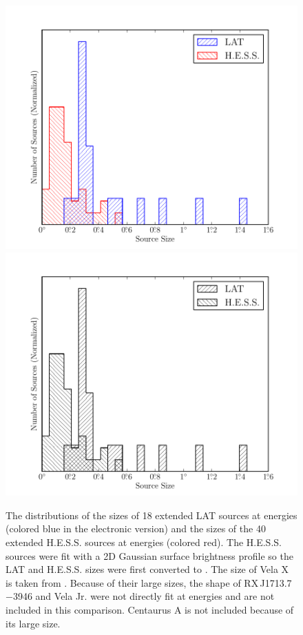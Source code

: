 \begin{figure}[htbp]
    \ifcolorfigure
      \includegraphics{summary_plots/gev_vs_tev_histogram_color.pdf}
    \else
      \includegraphics{summary_plots/gev_vs_tev_histogram_bw.pdf}
    \fi
    \caption{
    The distributions of the sizes of 18 extended LAT sources
    at \gev energies
    (colored blue in the electronic version) and the sizes of the
    40 extended H.E.S.S. sources at \tev energies
    (colored red).  
    The H.E.S.S. sources were fit with a 2D Gaussian surface
    brightness profile so the LAT and H.E.S.S. sizes were first converted
    to \rsixeight. 
    The \gev size of Vela X is taken from \cite{abdo_2010c_fermi-large}.  
    Because of their large sizes, the shape of RX\,J1713.7$-$3946 and
    Vela Jr. were not directly fit at \tev energies
    and are not included in this comparison.
    Centaurus A is not included because of its large size.
    }
  \end{figure}

